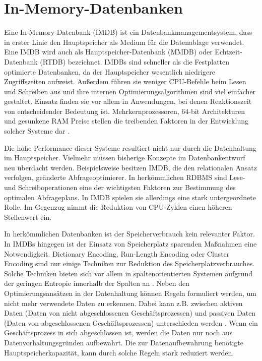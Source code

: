\section{In-Memory-Datenbanken}
\label{ch:grundlagen:sec:InMemoryDatenbanken}

Eine In-Memory-Datenbank (IMDB) ist ein Datenbankmanagementsystem, dass in erster Linie den Hauptspeicher als Medium für die Datenablage verwendet. Eine IMDB wird auch als Hauptspeicher-Datenbank (MMDB) oder Echtzeit-Datenbank (RTDB) bezeichnet. IMDBs sind schneller als die Festplatten optimierte Datenbanken, da der Hauptspeicher wesentlich niedrigere Zugriffszeiten aufweist. Außerdem führen sie weniger CPU-Befehle beim Lesen und Schreiben aus und ihre internen Optimierungsalgorithmen sind viel einfacher gestaltet. Einsatz finden sie vor allem in Anwendungen, bei denen Reaktionszeit von entscheidender Bedeutung ist. Mehrkernprozessoren, 64-bit Architekturen und gesunkene RAM Preise stellen die treibenden Faktoren in der Entwicklung solcher Systeme dar \cite{SWB-381840476}.

Die hohe Performance dieser Systeme resultiert nicht nur durch die Datenhaltung im Hauptspeicher. Vielmehr müssen bisherige Konzepte im Datenbankentwurf neu überdacht werden. Beispielsweise besitzen IMDB, die den relationalen Ansatz verfolgen, geänderte Abfrageoptimierer. In herkömmlichen RDBMS sind Lese- und Schreiboperationen eine der wichtigsten Faktoren zur Bestimmung des optimalen Abfrageplans. In IMDB spielen sie allerdings eine stark untergeordnete Rolle. Im Gegenzug nimmt die Reduktion von CPU-Zyklen einen höheren Stellenwert ein.

In herkömmlichen Datenbanken ist der Speicherverbrauch kein relevanter Faktor. In IMDBs hingegen ist der Einsatz von Speicherplatz sparenden Maßnahmen eine Notwendigkeit. Dictionary Encoding, Run-Length Encoding oder Cluster Encoding sind nur einige Techniken zur Reduktion des Speicherplatzverbrauches. Solche Techniken bieten sich vor allem in spaltenorientierten Systemen aufgrund der geringen Entropie innerhalb der Spalten an \cite{Abadi:2006:ICE:1142473.1142548}. Neben den Optimierungsansätzen in der Datenhaltung können Regeln formuliert werden, um nicht mehr verwendete Daten zu erkennen. Dabei kann z.B. zwischen aktiven Daten (Daten von nicht abgeschlossenen Geschäftsprozessen) und passiven Daten (Daten von abgeschlossenen Geschäftsprozessen) unterschieden werden \cite{10.1109/ICDE.2013.6544811}. Wenn ein Geschäftsprozess in sich abgeschlossen ist, werden die Daten nur noch aus Datenvorhaltungsgründen aufbewahrt. Die zur Datenaufbewahrung benötigte Hauptspeicherkapazität, kann durch solche Regeln stark reduziert werden.

